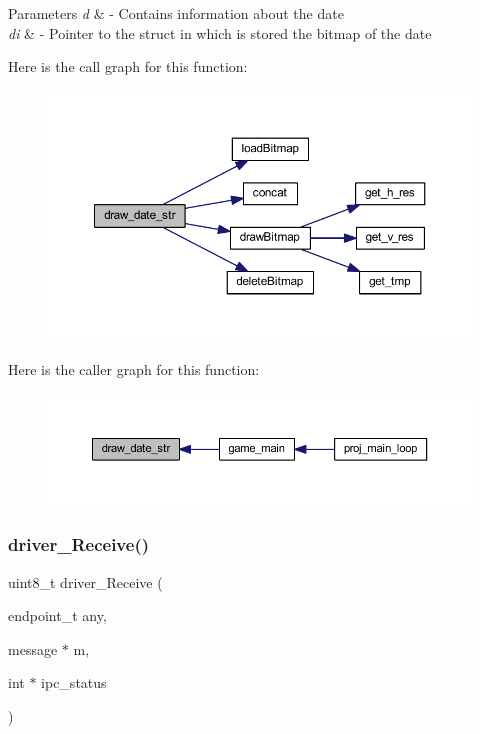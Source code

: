 \begin{DoxyParams}{Parameters}
{\em d} & -\/ Contains information about the date \\
\hline
{\em di} & -\/ Pointer to the struct in which is stored the bitmap of the date \\
\hline
\end{DoxyParams}
Here is the call graph for this function\+:
\nopagebreak
\begin{figure}[H]
\begin{center}
\leavevmode
\includegraphics[width=350pt]{group__game_ga75e50926d07db9cfd2bad44c163f2bdd_cgraph}
\end{center}
\end{figure}
Here is the caller graph for this function\+:
\nopagebreak
\begin{figure}[H]
\begin{center}
\leavevmode
\includegraphics[width=350pt]{group__game_ga75e50926d07db9cfd2bad44c163f2bdd_icgraph}
\end{center}
\end{figure}
\mbox{\label{group__game_ga221b757ab658deb87f4ccd865d29a9ff}} 
\subsubsection{\texorpdfstring{driver\+\_\+\+Receive()}{driver\_Receive()}}
{\footnotesize\ttfamily uint8\+\_\+t driver\+\_\+\+Receive (\begin{DoxyParamCaption}\item[{endpoint\+\_\+t}]{any,  }\item[{message $\ast$}]{m,  }\item[{int $\ast$}]{ipc\+\_\+status }\end{DoxyParamCaption})}



